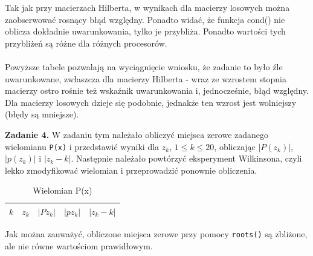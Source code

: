 \documentclass[15pt, a4paper]{article}
\begin{document}
\vspace{0.5cm}

\noindent Tak jak przy macierzach Hilberta, w wynikach dla macierzy losowych można zaobserwować rosnący błąd względny. Ponadto widać, że funkcja cond() nie oblicza dokładnie uwarunkowania, tylko je przybliża. Ponadto wartości tych przybliżeń są różne dla różnych procesorów. \\\\
\noindent Powyższe tabele pozwalają na wyciągnięcie wniosku, że zadanie to było źle uwarunkowane, zwłaszcza dla macierzy Hilberta - wraz ze wzrostem stopnia macierzy ostro rośnie też wskaźnik uwarunkowania i, jednocześnie, błąd względny. Dla macierzy losowych dzieje się podobnie, jednakże ten wzrost jest wolniejszy (błędy są mniejsze).

\vspace{0.5cm}

\noindent\hrulefill


\vspace{0.5cm}

\noindent\textbf{Zadanie 4.} W zadaniu tym należało obliczyć miejsca zerowe zadanego wielomianu \verb|P(x)| i przedstawić wyniki dla \( z_k \), \( 1 \leq k \leq 20 \), obliczając \( |P(z_k)| \), \( |p(z_k)| \) i \( |z_k - k| \). Następnie należało powtórzyć eksperyment Wilkinsona, czyli lekko zmodyfikować wielomian i przeprowadzić ponownie obliczenia.

\vspace{0.5cm}

\begin{table}[h]
    \begin{adjustbox}{max width=\textwidth}
    \begin{tabular}{|c|c|c|c|c|}
        \hline
        \(k\) & \(z_k\) & \(|Pz_k|\) & \(|pz_k|\) & \(|z_k - k|\) \\ \hline
           \end{tabular}
    \end{adjustbox}
    \label{wielomian}
    \caption{Wielomian P(x)}
\end{table}

\vspace{0.5cm}

\noindent Jak można zauważyć, obliczone miejsca zerowe przy pomocy \verb|roots()| są zbliżone, ale nie równe wartościom prawidłowym.

\vspace{0.5cm}
\end{document}
